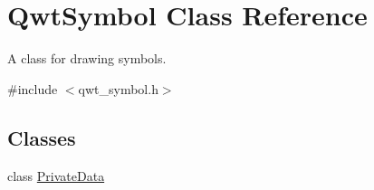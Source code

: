 \hypertarget{class_qwt_symbol}{\section{Qwt\-Symbol Class Reference}
\label{class_qwt_symbol}
}


A class for drawing symbols.  




{\ttfamily \#include $<$qwt\-\_\-symbol.\-h$>$}

\subsection*{Classes}
\begin{DoxyCompactItemize}
\item 
class \hyperlink{class_qwt_symbol_1_1_private_data}{Private\-Data}
\end{DoxyCompactItemize}
